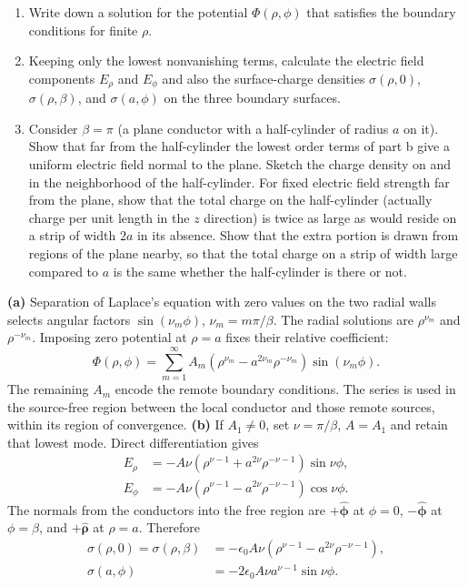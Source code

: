 \begin{enumerate}
\item[(a)] Write down a solution for the potential $\Phi(\rho,\phi)$ that satisfies the boundary conditions for finite $\rho$.
\item[(b)] Keeping only the lowest nonvanishing terms, calculate the electric field components $E_{\rho}$ and $E_{\phi}$ and also the surface-charge densities $\sigma(\rho,0)$, $\sigma(\rho,\beta)$, and $\sigma(a,\phi)$ on the three boundary surfaces.
\item[(c)] Consider $\beta=\pi$ (a plane conductor with a half-cylinder of radius $a$ on it). Show that far from the half-cylinder the lowest order terms of part b give a uniform electric field normal to the plane. Sketch the charge density on and in the neighborhood of the half-cylinder. For fixed electric field strength far from the plane, show that the total charge on the half-cylinder (actually charge per unit length in the $z$ direction) is twice as large as would reside on a strip of width $2a$ in its absence. Show that the extra portion is drawn from regions of the plane nearby, so that the total charge on a strip of width large compared to $a$ is the same whether the half-cylinder is there or not.
\end{enumerate}
\solution
\textbf{(a)} Separation of Laplace's equation with zero values on
the two radial walls selects angular factors
$\sin(\nu_m\phi)$, $\nu_m=m\pi/\beta$.
The radial solutions are $\rho^{\nu_m}$ and $\rho^{-\nu_m}$.
Imposing zero potential at $\rho=a$ fixes their relative coefficient:
\[
\boxed{\Phi(\rho,\phi)=\sum_{m=1}^\infty A_m
 \left(\rho^{\nu_m}-a^{2\nu_m}\rho^{-\nu_m}\right)
                           \sin(\nu_m\phi).}
\]
The remaining $A_m$ encode the remote boundary conditions. The series
is used in the source-free region between the local conductor and
those remote sources, within its region of convergence.
\textbf{(b)} If $A_1\ne0$, set $\nu=\pi/\beta$, $A=A_1$ and retain
that lowest mode. Direct differentiation gives
\[
\boxed{\begin{aligned}
E_\rho&=-A\nu(\rho^{\nu-1}+a^{2\nu}\rho^{-\nu-1})\sin\nu\phi,\\
E_\phi&=-A\nu(\rho^{\nu-1}-a^{2\nu}\rho^{-\nu-1})\cos\nu\phi.
\end{aligned}}
\]
The normals from the conductors into the free region are
$+\widehat{\boldsymbol\phi}$ at $\phi=0$,
$-\widehat{\boldsymbol\phi}$ at $\phi=\beta$, and
$+\widehat{\boldsymbol\rho}$ at $\rho=a$. Therefore
\[
\boxed{\begin{aligned}
\sigma(\rho,0)=\sigma(\rho,\beta)
 &=-\epsilon _0A\nu(\rho^{\nu-1}-a^{2\nu}\rho^{-\nu-1}),\\
\sigma(a,\phi)&=-2\epsilon _0A\nu a^{\nu-1}\sin\nu\phi.
\end{aligned}}
\]
